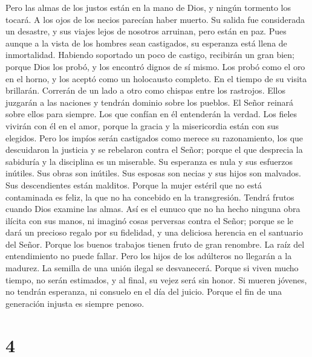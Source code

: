  Pero las almas de los justos están en la mano de Dios, y
ningún tormento los tocará.  A los ojos de los necios
parecían haber muerto. Su salida fue considerada un desastre,
 y sus viajes lejos de nosotros arruinan, pero están en
paz.  Pues aunque a la vista de los hombres sean
castigados, su esperanza está llena de inmortalidad. 
Habiendo soportado un poco de castigo, recibirán un gran bien; porque
Dios los probó, y los encontró dignos de sí mismo.  Los
probó como el oro en el horno, y los aceptó como un holocausto completo.
 En el tiempo de su visita brillarán. Correrán de un lado
a otro como chispas entre los rastrojos.  Ellos juzgarán a
las naciones y tendrán dominio sobre los pueblos. El Señor reinará sobre
ellos para siempre.  Los que confían en él entenderán la
verdad. Los fieles vivirán con él en el amor, porque la gracia y la
misericordia están con sus elegidos.  Pero los impíos
serán castigados como merece su razonamiento, los que descuidaron la
justicia y se rebelaron contra el Señor;  porque el que
desprecia la sabiduría y la disciplina es un miserable. Su esperanza es
nula y sus esfuerzos inútiles. Sus obras son inútiles. 
Sus esposas son necias y sus hijos son malvados.  Sus
descendientes están malditos. Porque la mujer estéril que no está
contaminada es feliz, la que no ha concebido en la transgresión. Tendrá
frutos cuando Dios examine las almas.  Así es el eunuco
que no ha hecho ninguna obra ilícita con sus manos, ni imaginó cosas
perversas contra el Señor; porque se le dará un precioso regalo por su
fidelidad, y una deliciosa herencia en el santuario del Señor.
 Porque los buenos trabajos tienen fruto de gran
renombre. La raíz del entendimiento no puede fallar. 
Pero los hijos de los adúlteros no llegarán a la madurez. La semilla de
una unión ilegal se desvanecerá.  Porque si viven mucho
tiempo, no serán estimados, y al final, su vejez será sin honor.
 Si mueren jóvenes, no tendrán esperanza, ni consuelo en
el día del juicio.  Porque el fin de una generación
injusta es siempre penoso.

\hypertarget{section-3}{%
\section{4}\label{section-3}}

